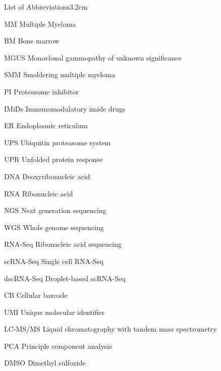 \begin{mclistof}{List of Abbreviations}{3.2cm}

\item[MM] Multiple Myeloma

\item[BM] Bone marrow

\item[MGUS] Monoclonal gammopathy of unknown significance

\item[SMM] Smoldering multiple myeloma

\item[PI] Proteasome inhibitor

\item[IMiDs] Immunomodulatory imide drugs

\item[ER] Endoplasmic reticulum

\item[UPS] Ubiquitin proteasome system

\item[UPR] Unfolded protein response

\item[DNA] Deoxyribonucleic acid

\item[RNA] Ribonucleic acid

\item[NGS] Next generation sequencing

\item[WGS] Whole genome sequencing

\item[RNA-Seq] Ribonucleic acid sequencing

\item[scRNA-Seq] Single cell RNA-Seq

\item[dscRNA-Seq] Droplet-based scRNA-Seq

\item[CB] Cellular barcode

\item[UMI] Unique molecular identifier

\item[LC-MS/MS] Liquid chromatography with tandem mass spectrometry

\item[PCA] Principle component analysis

\item{DMSO} Dimethyl sulfoxide

\end{mclistof} 
